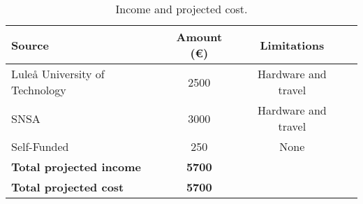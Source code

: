 \begin{table}[H]
\centering
\begin{tabular}{|l|c|c|c|} 
\hline
Source & Amount (\euro) & Limitations   \\ 
\hline
Luleå University of Technology & 2500 & Hardware and travel \\
SNSA & 3000 & Hardware and travel \\
Self-Funded & 250 & None\\
\hline
\textbf{Total projected income} & \textbf{5700} & \\
\hline
\bf{Total projected cost} & \bf{5700} & \\
\hline
\end{tabular}
\caption{Income and projected cost.}
\label{table:income-and-cost}
\end{table}

\raggedbottom